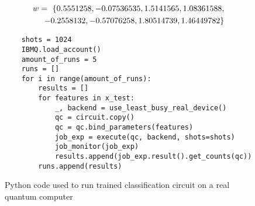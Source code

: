 \begin{equation}
    \centering
    \begin{split}
        w =\ \{0.5551258, -0.07536535, 1.5141565, 1.08361588, \\
        -0.2558132, -0.57076258, 1.80514739, 1.46449782\}
    \end{split}
    \label{equation:weights_trained_circuit}
\end{equation}

\begin{figure}[!ht]
    \centering
    \begin{verbatim}
    shots = 1024
    IBMQ.load_account()
    amount_of_runs = 5
    runs = []
    for i in range(amount_of_runs):
        results = []
        for features in x_test:
            _, backend = use_least_busy_real_device()
            qc = circuit.copy()
            qc = qc.bind_parameters(features)
            job_exp = execute(qc, backend, shots=shots)
            job_monitor(job_exp)
            results.append(job_exp.result().get_counts(qc))
        runs.append(results)
    \end{verbatim}
    \caption{Python code used to run trained classification circuit on a real quantum computer}
    \label{fig:code_real_hardware}
\end{figure}

